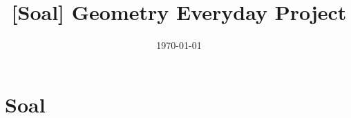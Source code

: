 

\title{[Soal] Geometry Everyday Project}
\date{\today}



\maketitle

\renewcommand*\contentsname{Daftar Isi}
\tableofcontents

\newpage
\section{Soal}




